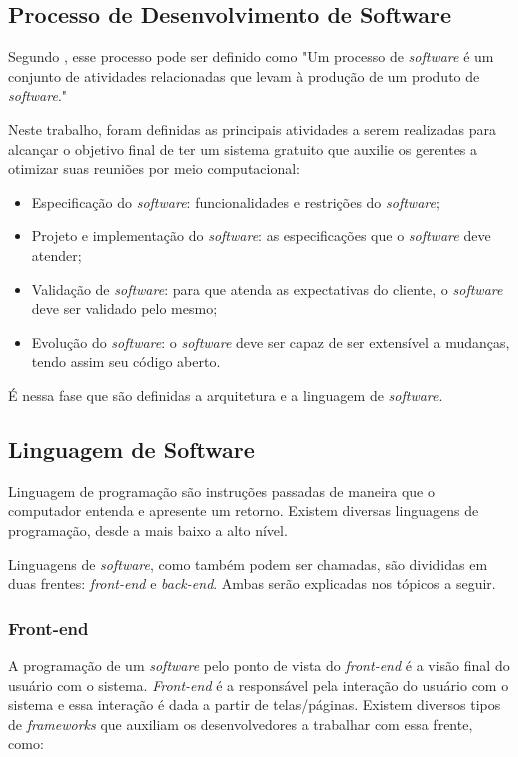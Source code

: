 \subsection{Processo de Desenvolvimento de Software}

Segundo \cite{sommerville}, esse processo pode ser definido como "Um processo de \textit{software} é um conjunto de atividades relacionadas que levam à produção de um produto de \textit{software}."

Neste trabalho, foram definidas as principais atividades a serem realizadas para alcançar o objetivo final de ter um sistema gratuito que auxilie os gerentes a otimizar suas reuniões por meio computacional:

\begin{itemize}
    \item Especificação do \textit{software}: funcionalidades e restrições do \textit{software};
    \item Projeto e implementação do \textit{software}: as especificações que o \textit{software} deve atender;
    \item Validação de \textit{software}: para que atenda as expectativas do cliente, o \textit{software} deve ser validado pelo mesmo;
    \item Evolução do \textit{software}: o \textit{software} deve ser capaz de ser extensível a mudanças, tendo assim seu código aberto.
\end{itemize}

É nessa fase que são definidas a arquitetura e a linguagem de \textit{software}.

\subsection{Linguagem de Software}

Linguagem de programação são instruções passadas de maneira que o computador entenda e apresente um retorno. Existem diversas linguagens de programação, desde a mais baixo a alto nível.

Linguagens de \textit{software}, como também podem ser chamadas, são divididas em duas frentes: \textit{front-end} e \textit{back-end}. Ambas serão explicadas nos tópicos a seguir.

\subsubsection{Front-end}

A programação de um \textit{software} pelo ponto de vista do \textit{front-end} é a visão final do usuário com o sistema. \textit{Front-end} é a responsável pela interação do usuário com o sistema e essa interação é dada a partir de telas/páginas. Existem diversos tipos de \textit{frameworks} que auxiliam os desenvolvedores a trabalhar com essa frente, como:


